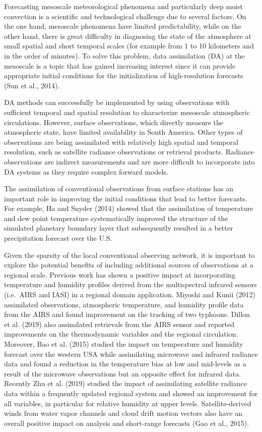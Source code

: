 \documentclass[final,5p,times,twocolumn,authoryear]{elsarticle} %
\begin{document}
Forecasting mesoscale meteorological phenomena and particularly deep moist convection is a scientific and technological challenge due to several factors.
On the one hand, mesoscale phenomena have limited predictability, while on the other hand, there is great difficulty in diagnosing the state of the atmosphere at small spatial and short temporal scales (for example from 1 to 10 kilometers and in the order of minutes).
To solve this problem, data assimilation (DA) at the mesoscale is a topic that has gained increasing interest since it can provide appropriate initial conditions for the initialization of high-resolution forecasts (Sun et al., 2014).

DA methods can successfully be implemented by using observations with sufficient temporal and spatial resolution to characterize mesoscale atmospheric circulations.
However, surface observations, which directly measure the atmospheric state, have limited availability in South America.
Other types of observations are being assimilated with relatively high spatial and temporal resolution, such as satellite radiance observations or retrieval products.
Radiance observations are indirect measurements and are more difficult to incorporate into DA systems as they require complex forward models.

The assimilation of conventional observations from surface stations has an important role in improving the initial conditions that lead to better forecasts.
For example, Ha and Snyder (2014) showed that the assimilation of temperature and dew point temperature systematically improved the structure of the simulated planetary boundary layer that subsequently resulted in a better precipitation forecast over the U.S.

Given the sparsity of the local conventional observing network, it is important to explore the potential benefits of including additional sources of observations at a regional scale.
Previous work has shown a positive impact at incorporating temperature and humidity profiles derived from the multispectral infrared sensors (i.e.~AIRS and IASI) in a regional domain application.
Miyoshi and Kunii (2012) assimilated observations, atmospheric temperature, and humidity profile data from the AIRS and found improvement on the tracking of two typhoons.
Dillon et al. (2019) also assimilated retrievals from the AIRS sensor and reported improvements on the thermodynamic variables and the regional circulation.
Moreover, Bao et al. (2015) studied the impact on temperature and humidity forecast over the western USA while assimilating microwave and infrared radiance data and found a reduction in the temperature bias at low and mid-levels as a result of the microwave observations but an opposite effect for infrared data. Recently Zhu et al. (2019) studied the impact of assimilating satellite radiance data within a frequently updated regional system and showed an improvement for all variables, in particular for relative humidity at upper levels.
Satellite-derived winds from water vapor channels and cloud drift motion vectors also have an overall positive impact on analysis and short-range forecasts (Gao et al., 2015).
\end{document}
